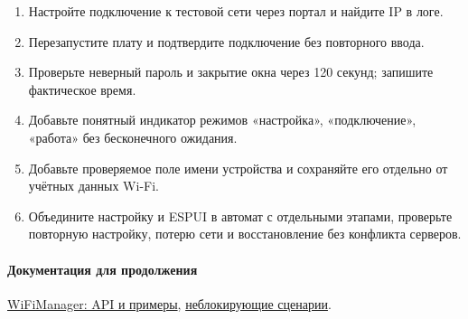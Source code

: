 \begin{tasks}
\begin{enumerate}
  \item {} Настройте подключение к тестовой сети через портал и найдите IP в логе.
  \item {} Перезапустите плату и подтвердите подключение без повторного ввода.
  \item {} Проверьте неверный пароль и закрытие окна через 120 секунд; запишите фактическое время.
  \item {} Добавьте понятный индикатор режимов «настройка», «подключение», «работа» без бесконечного ожидания.
  \item {} Добавьте проверяемое поле имени устройства и сохраняйте его отдельно от учётных данных Wi-Fi.
  \item {} Объедините настройку и ESPUI в автомат с отдельными этапами, проверьте повторную настройку, потерю сети и восстановление без конфликта серверов.
\end{enumerate}
\end{tasks}

\paragraph{Документация для продолжения}
\href{https://github.com/tzapu/WiFiManager}{WiFiManager: API и примеры},
\href{https://github.com/tzapu/WiFiManager/tree/master/examples/NonBlocking}{неблокирующие сценарии}.
